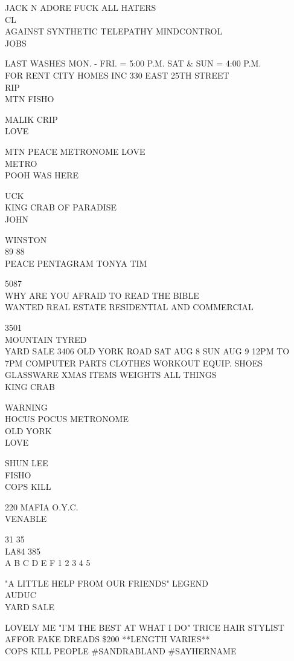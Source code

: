 \documentclass[10pt,letterpaper]{article}
\begin{document}
JACK N ADORE FUCK ALL HATERS\\
CL\\
AGAINST SYNTHETIC TELEPATHY MINDCONTROL\\
JOBS

LAST WASHES MON. {-} FRI. = 5:00 P.M. SAT \& SUN = 4:00 P.M.\\
FOR RENT CITY HOMES INC 330 EAST 25TH STREET\\
RIP\\
MTN FISHO

MALIK CRIP\\
LOVE

MTN PEACE METRONOME LOVE\\
METRO\\
POOH WAS HERE

UCK\\
KING CRAB OF PARADISE\\
JOHN

WINSTON\\
89 88\\
PEACE PENTAGRAM TONYA TIM

5087\\
WHY ARE YOU AFRAID TO READ THE BIBLE\\
WANTED REAL ESTATE RESIDENTIAL AND COMMERCIAL

3501\\
MOUNTAIN TYRED\\
YARD SALE 3406 OLD YORK ROAD SAT AUG 8 SUN AUG 9 12PM TO 7PM COMPUTER PARTS CLOTHES WORKOUT EQUIP. SHOES GLASSWARE XMAS ITEMS WEIGHTS ALL THINGS\\
KING CRAB

WARNING\\
HOCUS POCUS METRONOME\\
OLD YORK\\
LOVE

SHUN LEE\\
FISHO\\
COPS KILL

220 MAFIA O.Y.C.\\
VENABLE

31 35\\
LA84 385\\
A B C D E F 1 2 3 4 5

"A LITTLE HELP FROM OUR FRIENDS" LEGEND\\
AUDUC\\
YARD SALE

LOVELY ME "I'M THE BEST AT WHAT I DO" TRICE HAIR STYLIST\\
AFFOR FAKE DREADS \$200 **LENGTH VARIES**\\
COPS KILL PEOPLE \#SANDRABLAND \#SAYHERNAME
\end{document}
